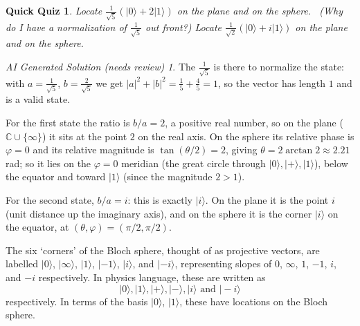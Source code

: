 \documentclass{article}
\theoremstyle{plain}
\newtheorem{quiz}[theorem]{Quick Quiz}
\theoremstyle{definition}
\theoremstyle{remark}
\newtheorem*{aisolution}{AI Generated Solution (needs review)}
\numberwithin{theorem}{section}
\newcommand{\CC}{\mathbb{C}}
\begin{document}
\begin{quiz}
Locate $\frac{1}{\sqrt{5}}\left( |0\rangle + 2|1 \rangle \right)$ on the plane and on the sphere.  (Why do I have a normalization of $\frac{1}{\sqrt{5}}$ out front?)
Locate $\frac{1}{\sqrt{2}}\left( |0\rangle + i|1 \rangle \right)$ on the plane and on the sphere.
\end{quiz}
\begin{aisolution}
The $\frac{1}{\sqrt5}$ is there to normalize the state: with $a = \frac{1}{\sqrt5}$, $b = \frac{2}{\sqrt5}$ we get $|a|^2 + |b|^2 = \frac{1}{5} + \frac{4}{5} = 1$, so the vector has length $1$ and is a valid state.

For the first state the ratio is $b/a = 2$, a positive real number, so on the plane ($\CC\cup\{\infty\}$) it sits at the point $2$ on the real axis.  On the sphere its relative phase is $\varphi = 0$ and its relative magnitude is $\tan(\theta/2) = 2$, giving $\theta = 2\arctan 2 \approx 2.21$ rad; so it lies on the $\varphi = 0$ meridian (the great circle through $|0\rangle,|+\rangle,|1\rangle$), below the equator and toward $|1\rangle$ (since the magnitude $2 > 1$).

For the second state, $b/a = i$: this is exactly $|i\rangle$.  On the plane it is the point $i$ (unit distance up the imaginary axis), and on the sphere it is the corner $|i\rangle$ on the equator, at $(\theta,\varphi) = (\pi/2, \pi/2)$.
\end{aisolution}


The six `corners' of the Bloch sphere, thought of as projective vectors, are labelled $| 0 \rangle$, $| \infty \rangle$, $| 1 \rangle$, $| -1 \rangle$, $| i \rangle$, and $| -i \rangle$, representing slopes of $0$, $\infty$, $1$, $-1$, $i$, and $-i$ respectively.  In physics language, these are written as
\[
| 0 \rangle, | 1 \rangle, |+\rangle, |-\rangle, |i\rangle \text{ and } |-i \rangle
\]
respectively.  In terms of the basis $| 0 \rangle$, $| 1 \rangle$, these have locations on the Bloch sphere.

\newcommand\zeroket{|0 \rangle}
\newcommand\oneket{|1\rangle}
\newcommand\plusket{|+\rangle}
\newcommand\minusket{|-\rangle}
\newcommand\iket{|i\rangle}
\newcommand\miket{|-i\rangle}
\newcommand\oneroottwo{\frac{1}{\sqrt{2}}}
\newcommand\iroottwo{\frac{i}{\sqrt{2}}}
\end{document}
